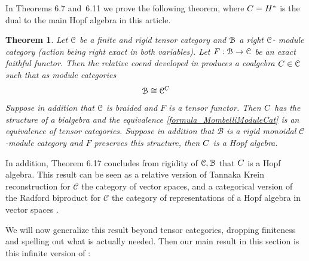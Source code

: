\documentclass[a4paper, reqno]{amsart}
\newtheorem{theorem}{Theorem}[section]
\theoremstyle{introTheorems}
\newcommand\cB{\mathcal{B}}
\newcommand\cC{\mathcal{C}}
\renewcommand{\1}{\mathbbold{1}}
\begin{document}
In \cites{LM25} Theorems 6.7 and~6.11 we prove the following theorem, where $C=H^*$ is the dual to the main Hopf algebra in this article.  

\begin{theorem}\label{thm:MombelliInfinite}
 Let $\mathcal{C}$ be a finite and rigid tensor category and $\mathcal{B}$ a right $\mathcal{C}$- module category (action being right exact in both variables). Let $F:\mathcal{B}\to \mathcal{C}$ be an exact faithful functor. Then the relative coend developed in \cite{BM21} produces a coalgebra $C\in \mathcal{C}$ such that as module categories 
 \begin{align}\label{formula_MombelliModuleCat}
     \mathcal{B}\cong \mathcal{C}^C
 \end{align}
 Suppose in addition that $\mathcal{C}$ is braided and $F$ is a tensor functor. Then $C$ has the structure of a bialgebra and the equivalence \eqref{formula_MombelliModuleCat} is an equivalence of tensor categories.  Suppose in addition that $\cB$ is a rigid monoidal $\cC$-module category and $F$ preserves  this structure, then $C$ is a Hopf algebra.
\end{theorem}
In addition, 
    Theorem 6.17  concludes from rigidity of $\mathcal{C},\mathcal{B}$ that $C$ is a Hopf algebra.
This result can be seen as a relative version of Tannaka Krein reconstruction \cite{Schau91} for $\cC$ the category of vector spaces, and a categorical version of the Radford biproduct for $\cC$ the category of representations of a Hopf algebra in vector spaces \cites{Maj95,Rad85}.

We will now generalize this result beyond tensor categories, dropping finiteness and spelling out what is actually needed. Then our main result in this section is this infinite version of \cite{LM25}:
\end{document}
